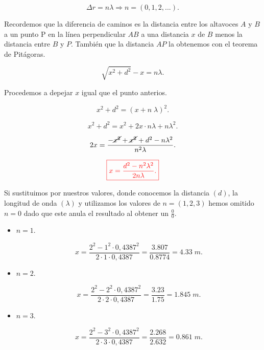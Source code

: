 \documentclass[a4paper,12pt]{article} %
\begin{document}
\[ \Delta r = n \lambda \Rightarrow n = (0,1,2,...). \]

\begin{justify}
    Recordemos que la diferencia de caminos es la distancia entre los altavoces \(A\) y \(B\) a un punto P en la
    línea perpendicular \(AB\) a una distancia \(x\) de \(B\) menos la distancia entre \(B\) y \(P\). También que la distancia 
    \(AP\) la obtenemos con el teorema de Pitágoras.
\end{justify}

\[ \sqrt{x^2+d^2} -x = n \lambda. \]

\begin{justify}
    Procedemos a depejar \(x\) igual que el punto anterios.
\end{justify}

\[ x^2+d^2 = \left(x  +  n \;  \lambda \right)^2. \]

\[x^2 + d^2 = x^2 +2x \cdot n \lambda + n \lambda^2. \]

\[2x = \frac{-\cancel{x^2} + \cancel{x^2} + d^2 - n \lambda^2 }{n^2 \lambda}.\]

\[\textcolor{red}{\boxed{ x = \frac{d^2 -n^2 \lambda^2}{2 n \lambda }. }} \]

\vspace{\baselineskip}

\begin{justify}
    Si sustituimos por nuestros valores, donde conocemos la distancia \((d)\), la longitud de onda \((\lambda)\)
    y utilizamos los valores de \(n = \left(1,2,3\right)\) hemos omitido \( n=0 \) dado que este anula el resultado al obtener un \(\frac{0}{0}\).
\end{justify}

\begin{itemize}
    \item \(n = 1.\)
    
    \[ x = \frac{2^2 -1^2 \cdot 0,4387^2}{2 \cdot 1 \cdot 0,4387} = \frac{3.807}{0.8774} = 4.33 \; m. \]

    \item \(n = 2.\)
    
    \[x = \frac{2^2 -2^2 \cdot 0,4387^2}{2 \cdot 2 \cdot 0,4387 } = \frac{3.23}{1.75} = 1.845 \; m. \]

    \item \(n = 3.\)
    
    \[x = \frac{2^2 -3^2 \cdot 0,4387^2}{2 \cdot  3 \cdot 0,4387 } = \frac{2.268}{2.632} =  0.861 \; m. \]
\end{itemize}
\end{document}
